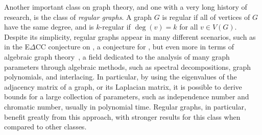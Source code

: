 Another important class on graph theory, and one with a very long history of research, is the class of \textit{regular graphs}.
A graph $G$ is regular if all of vertices of $G$ have the same degree, and is $k$-regular if $\deg(v) = k$ for all $v \in V(G)$.
Despite its simplicity, regular graphs appear in many different scenarios, such as in the E$\Delta$CC conjecture on , a conjecture for , but even more in terms of algebraic graph theory~\citep{godsil}, a field dedicated to the analysis of many graph parameters through algebraic methods, such as spectral decompositions, graph polynomials, and interlacing.
In particular, by using the eigenvalues of the adjacency matrix of a graph, or its Laplacian matrix, it is possible to derive bounds for a large collection of parameters, such as independence number and chromatic number, usually in polynomial time.
Regular graphs, in particular, benefit greatly from this approach, with stronger results for this class when compared to other classes.


